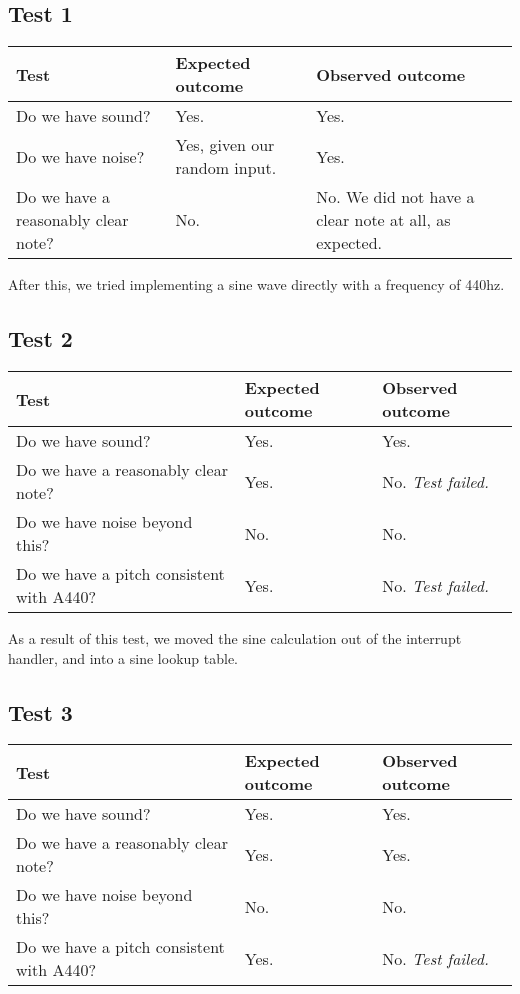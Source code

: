 \subsection*{Test 1}
\begin{center}
\begin{tabular}{|p{3.6cm}|p{3.6cm}|p{3.6cm}|}
\hline
{\sc Test} & {\sc Expected outcome} & {\sc Observed outcome}\\ \hline
Do we have sound? & Yes. & Yes.\\ \hline
Do we have noise? & Yes, given our random input. & Yes. \\ \hline
Do we have a reasonably clear note? & No. & No. We did not have a clear note at all, as expected.\\ \hline
\end{tabular}
\end{center}
After this, we tried implementing a sine wave directly with a frequency
of 440hz.
\subsection*{Test 2}
\begin{center}
\begin{tabular}{|p{3.6cm}|p{3.6cm}|p{3.6cm}|}
\hline
{\sc Test} & {\sc Expected outcome} & {\sc Observed outcome}\\ \hline
Do we have sound? & Yes. & Yes. \\ \hline
Do we have a reasonably clear note? & Yes. & No. {\em Test failed.} \\ \hline
Do we have noise beyond this? & No. & No. \\ \hline
Do we have a pitch consistent with A440? & Yes. & No. {\em Test failed.} \\
\hline
\end{tabular}
\end{center}

As a result of this test, we moved the sine calculation out of the
interrupt handler, and into a sine lookup table.
\subsection*{Test 3}
\begin{center}
\begin{tabular}{|p{3.6cm}|p{3.6cm}|p{3.6cm}|}
\hline
{\sc Test} & {\sc Expected outcome} & {\sc Observed outcome}\\ \hline
Do we have sound? & Yes. & Yes. \\ \hline
Do we have a reasonably clear note? & Yes. & Yes. \\ \hline
Do we have noise beyond this? & No. & No. \\ \hline
Do we have a pitch consistent with A440? & Yes. & No. {\em Test failed.} \\
\hline
\end{tabular}
\end{center}

